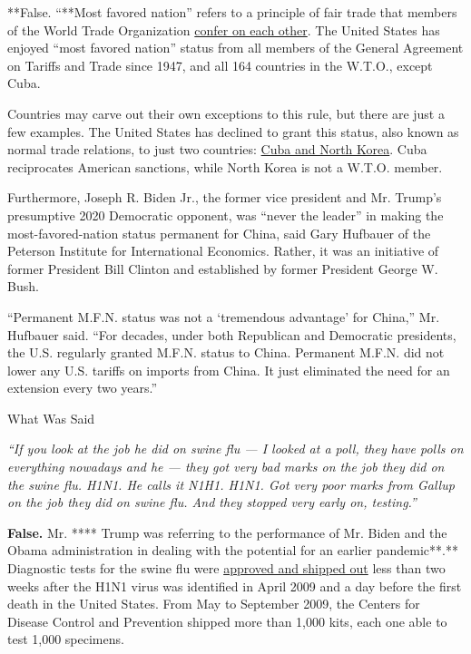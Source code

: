 **False. ``**Most favored nation'' refers to a principle of fair trade
that members of the World Trade Organization
\href{https://www.wto.org/english/thewto_e/whatis_e/tif_e/fact2_e.htm}{confer
on each other}. The United States has enjoyed ``most favored nation''
status from all members of the General Agreement on Tariffs and Trade
since 1947, and all 164 countries in the W.T.O., except Cuba.

Countries may carve out their own exceptions to this rule, but there are
just a few examples. The United States has declined to grant this
status, also known as normal trade relations, to just two countries:
\href{https://help.cbp.gov/s/article/Article-310?language=en_US}{Cuba
and North Korea}. Cuba reciprocates American sanctions, while North
Korea is not a W.T.O. member.

Furthermore, Joseph R. Biden Jr., the former vice president and Mr.
Trump's presumptive 2020 Democratic opponent, was ``never the leader''
in making the most-favored-nation status permanent for China, said Gary
Hufbauer of the Peterson Institute for International Economics. Rather,
it was an initiative of former President Bill Clinton and established by
former President George W. Bush.

``Permanent M.F.N. status was not a `tremendous advantage' for China,''
Mr. Hufbauer said. ``For decades, under both Republican and Democratic
presidents, the U.S. regularly granted M.F.N. status to China. Permanent
M.F.N. did not lower any U.S. tariffs on imports from China. It just
eliminated the need for an extension every two years.''

What Was Said

\emph{``If you look at the job he did on swine flu --- I looked at a
poll, they have polls on everything nowadays and he --- they got very
bad marks on the job they did on the swine flu. H1N1. He calls it N1H1.
H1N1. Got very poor marks from Gallup on the job they did on swine flu.
And they stopped very early on, testing.''}

\textbf{False.} Mr. **** Trump was referring to the performance of Mr.
Biden and the Obama administration in dealing with the potential for an
earlier pandemic**.** Diagnostic tests for the swine flu were
\href{https://www.nytimes3xbfgragh.onion/2020/03/13/us/politics/fact-check-trump-coronavirus.html}{approved
and shipped out} less than two weeks after the H1N1 virus was identified
in April 2009 and a day before the first death in the United States.
From May to September 2009, the Centers for Disease Control and
Prevention shipped more than 1,000 kits, each one able to test 1,000
specimens.

